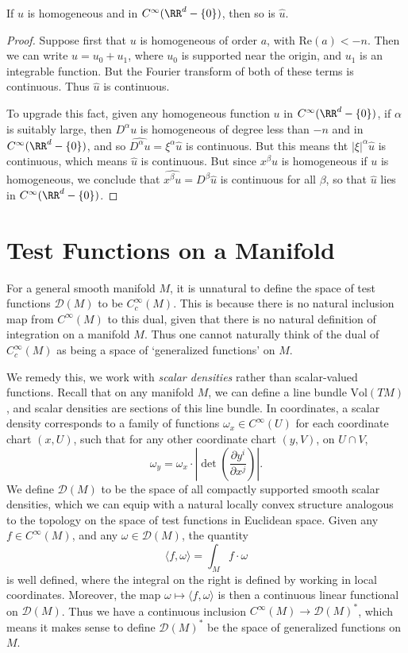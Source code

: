 \begin{lemma}
    If $u$ is homogeneous and in $C^\infty(\RR^d - \{ 0 \})$, then so is $\widehat{u}$.
\end{lemma}
\begin{proof}
    Suppose first that $u$ is homogeneous of order $a$, with $\text{Re}(a) < -n$. Then we can write $u = u_0 + u_1$, where $u_0$ is supported near the origin, and $u_1$ is an integrable function. But the Fourier transform of both of these terms is continuous. Thus $\widehat{u}$ is continuous.

    To upgrade this fact, given any homogeneous function $u$ in $C^\infty(\RR^d - \{ 0 \})$, if $\alpha$ is suitably large, then $D^\alpha u$ is homogeneous of degree less than $-n$ and in $C^\infty(\RR^d - \{ 0 \})$, and so $\widehat{D^\alpha u} = \xi^\alpha \widehat{u}$ is continuous. But this means tht $|\xi|^\alpha \widehat{u}$ is continuous, which means $\widehat{u}$ is continuous. But since $x^\beta u$ is homogeneous if $u$ is homogeneous, we conclude that $\widehat{x^\beta u} = D^\beta \widehat{u}$ is continuous for all $\beta$, so that $\widehat{u}$ lies in $C^\infty(\RR^d - \{ 0 \})$.
\end{proof}



\section{Test Functions on a Manifold}

For a general smooth manifold $M$, it is unnatural to define the space of test functions $\mathcal{D}(M)$ to be $C_c^\infty(M)$. This is because there is no natural inclusion map from $C^\infty(M)$ to this dual, given that there is no natural definition of integration on a manifold $M$. Thus one cannot naturally think of the dual of $C_c^\infty(M)$ as being a space of `generalized functions' on $M$.

We remedy this, we work with \emph{scalar densities} rather than scalar-valued functions. Recall that on any manifold $M$, we can define a line bundle $\text{Vol}(TM)$, and scalar densities are sections of this line bundle. In coordinates, a scalar density corresponds to a family of functions $\omega_x \in C^\infty(U)$ for each coordinate chart $(x,U)$, such that for any other coordinate chart $(y,V)$, on $U \cap V$,
%
\[ \omega_y = \omega_x \cdot \left| \det \left( \frac{\partial y^i}{\partial x^j} \right) \right|. \]
%
We define $\mathcal{D}(M)$ to be the space of all compactly supported smooth scalar densities, which we can equip with a natural locally convex structure analogous to the topology on the space of test functions in Euclidean space. Given any $f \in C^\infty(M)$, and any $\omega \in \mathcal{D}(M)$, the quantity
%
\[ \langle f, \omega \rangle = \int_M f \cdot \omega \]
%
is well defined, where the integral on the right is defined by working in local coordinates. Moreover, the map $\omega \mapsto \langle f, \omega \rangle$ is then a continuous linear functional on $\mathcal{D}(M)$. Thus we have a continuous inclusion $C^\infty(M) \to \mathcal{D}(M)^*$, which means it makes sense to define $\mathcal{D}(M)^*$ be the space of generalized functions on $M$.

